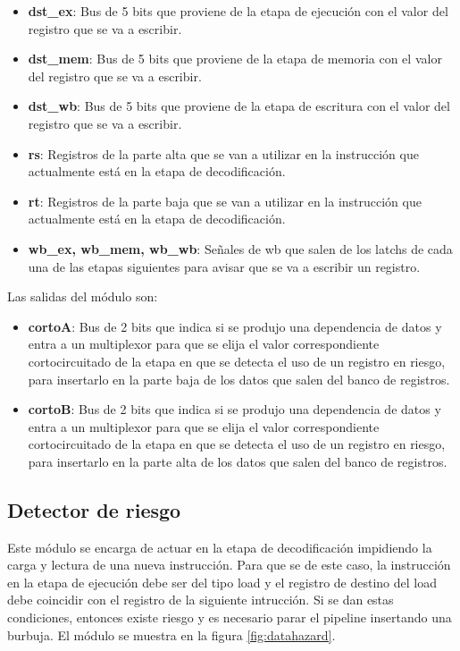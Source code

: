 \begin{itemize}
  \item \textbf{dst\_ex}: Bus de 5 bits que proviene de la etapa de ejecuci\'on con el valor del registro que se va a escribir.
  \item \textbf{dst\_mem}: Bus de 5 bits que proviene de la etapa de memoria	con el valor del registro que se va a escribir.
  \item \textbf{dst\_wb}: Bus de 5 bits que proviene de la etapa de escritura con el valor del registro que se va a escribir.
  \item \textbf{rs}: Registros de la parte alta que se van a utilizar en la instrucci\'on que actualmente est\'a en la etapa de decodificaci\'on.
  \item \textbf{rt}: Registros de la parte baja que se van a utilizar en la instrucci\'on que actualmente est\'a en la etapa de decodificaci\'on.
  \item \textbf{wb\_ex, wb\_mem, wb\_wb}: Señales de wb que salen de los latchs de cada una de las etapas siguientes para avisar que se va a escribir un registro.  
\end{itemize}

Las salidas del m\'odulo son:
\begin{itemize}
  \item \textbf{cortoA}: Bus de 2 bits que indica si se produjo una dependencia de datos y entra a un multiplexor para que se elija el valor correspondiente cortocircuitado de la etapa en que se detecta el uso de un registro en riesgo, para insertarlo en la parte baja de los datos que salen del banco de registros. 
  \item \textbf{cortoB}: Bus de 2 bits que indica si se produjo una dependencia de datos y entra a un multiplexor para que se elija el valor correspondiente cortocircuitado de la etapa en que se detecta el uso de un registro en riesgo, para insertarlo en la parte alta de los datos que salen del banco de registros.
\end{itemize}

\subsection{Detector de riesgo}

Este m\'odulo se encarga de actuar en la etapa de decodificaci\'on impidiendo la carga y lectura de una nueva instrucci\'on. Para que se de este caso, la instrucci\'on en la etapa de ejecuci\'on debe ser del tipo load y el registro de destino del load debe coincidir con el registro de la siguiente intrucci\'on. Si se dan estas condiciones, entonces existe riesgo y es necesario parar el pipeline insertando una burbuja. El m\'odulo se muestra en la figura \ref{fig:datahazard}.

